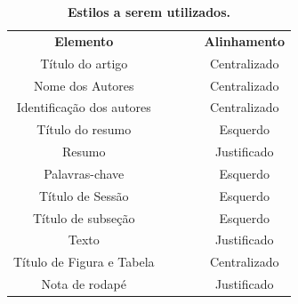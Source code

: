 \documentclass[10pt,brazil,english]{article}
\begin{document}
\begin{table}[h]
\centering
\caption{\textbf{Estilos a serem utilizados.}}
\label{my-label}
\begin{tabular}{c|l|l|l|c}
\hline
\multirow{3}{*}{\textbf{Elemento}} & \multirow{3}{*}{\textbf{}} & \multicolumn{2}{l|}{\multirow{2}{*}{\textbf{}}} & \multirow{3}{*}{\textbf{Alinhamento}} \\
                                   &                            & \multicolumn{2}{l|}{}                           &                                       \\ \cline{3-4}
                                   &                            &                        &                        &                                       \\ \hline
Título do artigo                   &                            &                        &                        & Centralizado                          \\ \hline
Nome dos Autores                   &                            &                        &                        & Centralizado                          \\ \hline
Identificação dos autores          &                            &                        &                        & Centralizado                          \\ \hline
Título do resumo                   &                            &                        &                        & Esquerdo                              \\ \hline
Resumo                             &                            &                        &                        & Justificado                           \\ \hline
Palavras-chave                     &                            &                        &                        & Esquerdo                              \\ \hline
Título de Sessão                   &                            &                        &                        & Esquerdo                              \\ \hline
Título de subseção                 &                            &                        &                        & Esquerdo                              \\ \hline
Texto                              &                            &                        &                        & Justificado                           \\ \hline
Título de Figura e Tabela          &                            &                        &                        & Centralizado                          \\ \hline
Nota de rodapé                     &                            &                        &                        & Justificado                           \\ \hline
\end{tabular}

\end{table}
\end{document}

